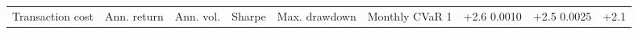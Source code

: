 \begin{tabular}{rlllllll}
\toprule
Transaction cost & Ann. return & Ann. vol. & Sharpe & Max. drawdown & Monthly CVaR 1%
 & +2.6%
0.0010 & +2.5%
0.0025 & +2.1%
\bottomrule
\end{tabular}
